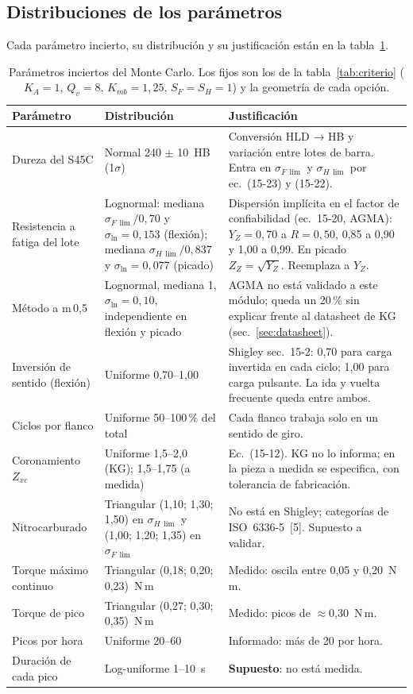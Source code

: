 \documentclass[11pt,a4paper]{article}
\begin{document}
\subsection{Distribuciones de los parámetros}
Cada parámetro incierto, su distribución y su justificación están en la tabla~\ref{tab:distrib}.
\begin{table}[!htb]\centering\footnotesize\setlength{\tabcolsep}{4pt}
\begin{tabularx}{\linewidth}{>{\raggedright\arraybackslash}p{2.9cm} >{\raggedright\arraybackslash}p{4.6cm} X}
\toprule
Parámetro & Distribución & Justificación\\\midrule
Dureza del S45C & Normal 240 $\pm$ 10~HB (1$\sigma$) & Conversión HLD → HB y variación entre lotes de barra.
   Entra en $\sigma_{F\,\lim}$ y $\sigma_{H\,\lim}$ por ec.~(15-23) y (15-22).\\
Resistencia a fatiga del lote & Lognormal: mediana $\sigma_{F\,\lim}/0{,}70$ y $\sigma_{\ln}=0{,}153$ (flexión);
   mediana $\sigma_{H\,\lim}/0{,}837$ y $\sigma_{\ln}=0{,}077$ (picado) & Dispersión implícita en el factor de confiabilidad
   (ec.~15-20, AGMA): $Y_Z=0{,}70$ a $R=0{,}50$, 0,85 a 0,90 y 1,00 a 0,99. En picado $Z_Z=\sqrt{Y_Z}$. Reemplaza a $Y_Z$.\\
Método a m\,0,5 & Lognormal, mediana 1, $\sigma_{\ln}=0{,}10$, independiente en flexión y picado & AGMA no está validado
   a este módulo; queda un 20\,\% sin explicar frente al datasheet de KG (sec.~\ref{sec:datasheet}).\\
Inversión de sentido (flexión) & Uniforme 0,70--1,00 & Shigley sec.~15-2: 0,70 para carga invertida en cada ciclo;
   1,00 para carga pulsante. La ida y vuelta frecuente queda entre ambos.\\
Ciclos por flanco & Uniforme 50--100\,\% del total & Cada flanco trabaja solo en un sentido de giro.\\
Coronamiento $Z_{xc}$ & Uniforme 1,5--2,0 (KG); 1,5--1,75 (a medida) & Ec.~(15-12). KG no lo informa; en la pieza a
   medida se especifica, con tolerancia de fabricación.\\
Nitrocarburado & Triangular (1,10; 1,30; 1,50) en $\sigma_{H\,\lim}$ y (1,00; 1,20; 1,35) en $\sigma_{F\,\lim}$ &
   No está en Shigley; categorías de ISO~6336-5~[5]. Supuesto a validar.\\
Torque máximo continuo & Triangular (0,18; 0,20; 0,23)~N\,m & Medido: oscila entre 0,05 y 0,20~N\,m.\\
Torque de pico & Triangular (0,27; 0,30; 0,35)~N\,m & Medido: picos de $\approx$0,30~N\,m.\\
Picos por hora & Uniforme 20--60 & Informado: más de 20 por hora.\\
Duración de cada pico & Log-uniforme 1--10~s & \textbf{Supuesto}: no está medida.\\
\bottomrule
\end{tabularx}
\caption{Parámetros inciertos del Monte Carlo. Los fijos son los de la tabla~\ref{tab:criterio}
($K_A=1$, $Q_v=8$, $K_{mb}=1{,}25$, $S_F=S_H=1$) y la geometría de cada opción.}\label{tab:distrib}
\end{table}
\end{document}
